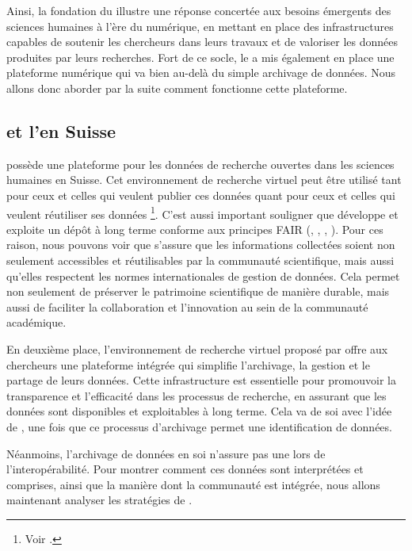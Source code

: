         Ainsi, la fondation du \dsc illustre une réponse concertée aux besoins émergents des sciences humaines à l'ère du numérique, en mettant en place des infrastructures capables de soutenir les chercheurs dans leurs travaux et de valoriser les données produites par leurs recherches. Fort de ce socle, le \dsc a mis également en place une plateforme numérique qui va bien au-delà du simple archivage de données. Nous allons donc aborder par la suite comment fonctionne cette plateforme.

        
        \subsection{\dsc et l'\opdt en Suisse}

        \dsc possède une plateforme pour les données de recherche ouvertes dans les sciences humaines en Suisse. Cet environnement de recherche virtuel peut être utilisé tant pour ceux et celles qui veulent publier ces données quant pour ceux et celles qui veulent réutiliser ses données \footnote{Voir \cite{re3data}.}. C'est aussi important souligner que \dsc développe et exploite un dépôt à long terme conforme aux principes FAIR (, , , ). Pour ces raison, nous pouvons voir que \dsc s’assure que les informations collectées soient non seulement accessibles et réutilisables par la communauté scientifique, mais aussi qu’elles respectent les normes internationales de gestion de données. Cela permet non seulement de préserver le patrimoine scientifique de manière durable, mais aussi de faciliter la collaboration et l’innovation au sein de la communauté académique.

        En deuxième place, l’environnement de recherche virtuel proposé par \dsc offre aux chercheurs une plateforme intégrée qui simplifie l’archivage, la gestion et le partage de leurs données. Cette infrastructure est essentielle pour promouvoir la transparence et l’efficacité dans les processus de recherche, en assurant que les données sont disponibles et exploitables à long terme. Cela va de soi avec l'idée de \psdn, une fois que ce processus d'archivage permet une identification de données.

        Néanmoins, l'archivage de données en soi n'assure pas une \psdn lors de l'interopérabilité. Pour montrer comment ces données sont interprétées et comprises, ainsi que la manière dont la communauté est intégrée, nous allons maintenant analyser les stratégies de \dsc.
        
